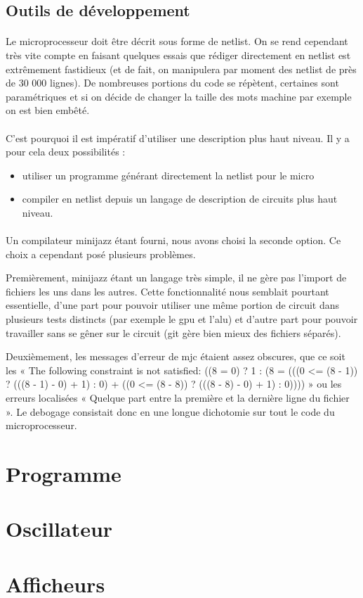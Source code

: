 \documentclass{article}
\begin{document}
\subsection{Outils de développement}

\paragraph{}Le microprocesseur doit être décrit sous forme de netlist. On se rend cependant très vite compte en faisant quelques essais que rédiger directement en netlist est extrêmement fastidieux (et de fait, on manipulera par moment des netlist de près de 30 000 lignes). De nombreuses portions du code se répètent, certaines sont paramétriques et si on décide de changer la taille des mots machine par exemple on est bien embêté.

\paragraph{}C'est pourquoi il est impératif d'utiliser une description plus haut niveau. Il y a pour cela deux possibilités :
\begin{itemize}
	\item utiliser un programme générant directement la netlist pour le micro
	\item compiler en netlist depuis un langage de description de circuits plus haut niveau.
\end{itemize}

\paragraph{}Un compilateur minijazz étant fourni, nous avons choisi la seconde option. Ce choix a cependant posé plusieurs problèmes.

Premièrement, minijazz étant un langage très simple, il ne gère pas l'import de fichiers les uns dans les autres. Cette fonctionnalité nous semblait pourtant essentielle, d'une part pour pouvoir utiliser une même portion de circuit dans plusieurs tests distincts (par exemple le gpu et l'alu) et d'autre part pour pouvoir travailler sans se gêner sur le circuit (git gère bien mieux des fichiers séparés).

Deuxièmement, les messages d'erreur de mjc étaient assez obscures, que ce soit les « The following constraint is not satisfied: ((8 = 0) ? 1 : (8 = (((0 <= (8 - 1)) ? (((8 - 1) - 0) + 1) : 0) + ((0 <= (8 - 8)) ? (((8 - 8) - 0) + 1) : 0)))) » ou les erreurs localisées « Quelque part entre la première et la dernière ligne du fichier ». Le debogage consistait donc en une longue dichotomie sur tout le code du microprocesseur.





\section{Programme}

\section{Oscillateur}

\section{Afficheurs}
\end{document}
